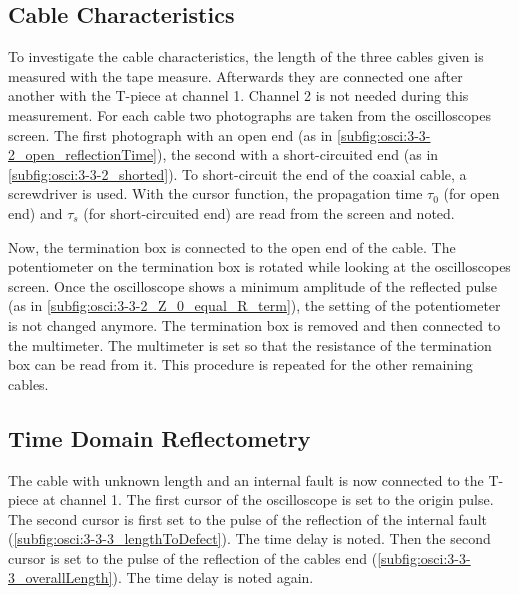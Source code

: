         \subsection{Cable Characteristics}
            To investigate the cable characteristics, the length of the three cables given is measured with the tape measure.
            Afterwards they are connected one after another with the T-piece at channel 1. Channel 2 is not needed during this
            measurement. For each cable two photographs are taken from the oscilloscopes screen. The first photograph with an open
            end (as in \cref{subfig:osci:3-3-2_open_reflectionTime}), the second with a short-circuited end (as in \cref{subfig:osci:3-3-2_shorted}). To short-circuit the end of the coaxial cable, a screwdriver is used. With
            the cursor function, the propagation time \(\tau_0\) (for open end) and \(\tau_s\) (for short-circuited end) are read from
            the screen and noted.\par
            Now, the termination box is connected to the open end of the cable. The potentiometer on the termination box is rotated
            while looking at the oscilloscopes screen. Once the oscilloscope shows a minimum amplitude of the reflected pulse (as in \cref{subfig:osci:3-3-2_Z_0_equal_R_term}), the
            setting of the potentiometer is not changed anymore. The termination box is removed and then connected to the multimeter.
            The multimeter is set so that the resistance of the termination box can be read from it. This procedure is repeated for
            the other remaining cables.
    \subsection{Time Domain Reflectometry}
        The cable with unknown length and an internal fault is now connected to the T-piece at channel 1. The first cursor of the
        oscilloscope is set to the origin pulse. The second cursor is first set to the pulse of the reflection of the internal
        fault (\cref{subfig:osci:3-3-3_lengthToDefect}). The time delay is noted. Then the second cursor is set to the pulse of the reflection of the cables end (\cref{subfig:osci:3-3-3_overallLength}). The time
        delay is noted again.
